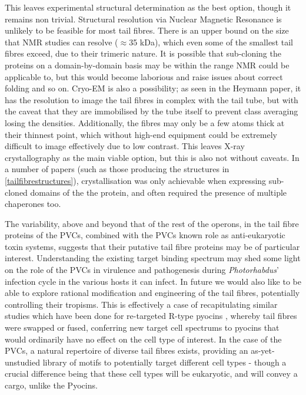 This leaves experimental structural determination as the best option, though it remains non trivial. Structural resolution via Nuclear Magnetic Resonance is unlikely to be feasible for most tail fibres. There is an upper bound on the size that NMR studies can resolve ($\approx$35 kDa), which even some of the smallest tail fibres exceed, due to their trimeric nature. It is possible that sub-cloning the proteins on a domain-by-domain basis may be within the range NMR could be applicable to, but this would become laborious and raise issues about correct folding and so on. Cryo-EM is also a possibility; as seen in the Heymann paper, it has the resolution to image the tail fibres in complex with the tail tube, but with the caveat that they are immobilised by the tube itself to prevent class averaging losing the densities. Additionally, the fibres may only be a few atoms thick at their thinnest point, which without high-end equipment could be extremely difficult to image effectively due to low contrast. This leaves X-ray crystallography as the main viable option, but this is also not without caveats. In a number of papers (such as those producing the structures in \vref{tailfibrestructures}), crystallisation was only achievable when expressing sub-cloned domains of the the protein, and often required the presence of multiple chaperones too.

The variability, above and beyond that of the rest of the operons, in the tail fibre proteins of the PVCs, combined with the PVCs known role as anti-eukaryotic toxin systems, suggests that their putative tail fibre proteins may be of particular interest. Understanding the existing target binding spectrum may shed some light on the role of the PVCs in virulence and pathogenesis during \emph{Photorhabdus}' infection cycle in the various hosts it can infect. In future we would also like to be able to explore rational modification and engineering of the tail fibres, potentially  controlling their tropisms. This is effectively a case of recapitulating similar studies which have been done for re-targeted R-type pyocins \citep{Scholl2009a}, whereby tail fibres were swapped or fused, conferring new target cell spectrums to pyocins that would ordinarily have no effect on the cell type of interest. In the case of the PVCs, a natural repertoire of diverse tail fibres exists, providing an as-yet-unstudied library of motifs to potentially target different cell types - though a crucial difference being that these cell types will be eukaryotic, and will convey a cargo, unlike the Pyocins.

